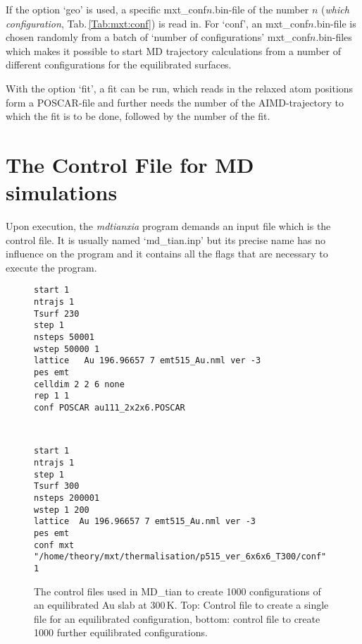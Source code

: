 \documentclass[twoside, 11pt, titlepage, captions=nooneline, a4paper, headsepline]{scrbook}%
\begin{document}
If the option `geo' is used, a specific mxt\_conf$n$.bin-file of the number $n$ (\textit{which configuration}, Tab.\,\ref{Tab:mxt:conf}) is read in. For `conf', an mxt\_conf$n$.bin-file is chosen randomly from a batch of `number of configurations' mxt\_conf$n$.bin-files which makes it possible to start MD trajectory calculations from a number of different configurations for the equilibrated surfaces.

With the option `fit', a fit can be run, which reads in the relaxed atom positions form a POSCAR-file and further needs the number of the AIMD-trajectory to which the fit is to be done, followed by the number of the fit.


\section{The Control File for MD simulations}
Upon execution, the \textit{mdtianxia} program demands an input file which is the control file. It is usually named `md\_tian.inp' but its precise name has no influence on the program and it contains all the flags that are necessary to execute the program.
\begin{figure}[t!]
\begin{minipage}{0.9\textwidth}
\centering
\begin{verbatim}
start 1
ntrajs 1
Tsurf 230
step 1
nsteps 50001
wstep 50000 1
lattice   Au 196.96657 7 emt515_Au.nml ver -3
pes emt
celldim 2 2 6 none 
rep 1 1
conf POSCAR au111_2x2x6.POSCAR
\end{verbatim}
\end{minipage}
\begin{minipage}{0.9\textwidth}
\centering
\begin{verbatim}


\end{verbatim}
   
\end{minipage}
\begin{minipage}{0.9\textwidth}
\centering
\begin{verbatim}
start 1
ntrajs 1
step 1
Tsurf 300
nsteps 200001
wstep 1 200
lattice  Au 196.96657 7 emt515_Au.nml ver -3
pes emt
conf mxt "/home/theory/mxt/thermalisation/p515_ver_6x6x6_T300/conf" 1
\end{verbatim}
\end{minipage}
\caption{\label{Fig:mxt:thermalization}The control files used in MD\_tian to create 1000 configurations of an equilibrated Au slab at 300\,K. Top: Control file to create a single file for an equilibrated configuration, bottom: control file to create 1000 further equilibrated configurations.}
\end{figure}
\end{document}
